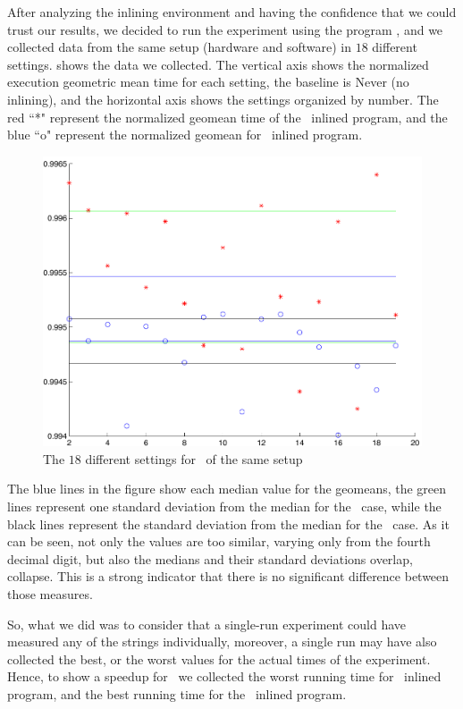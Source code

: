 After analyzing the inlining environment and having the confidence that we could trust our results, we decided to run the experiment using the program \bzip, and we collected data from the same setup (hardware and software) in $18$ different settings.  shows the data we collected. The vertical axis shows the normalized execution geometric mean time for each setting, the baseline is Never (no inlining), and the horizontal axis shows the settings organized by number. The red ``*" represent the normalized geomean time of the \FDO\ inlined program, and the blue ``o" represent the normalized geomean for \llvm\ inlined program.

\begin{figure}
  \centering
  \includegraphics[width=1.00\linewidth]{Figures/fdllrep}
  \caption{The $18$ different settings for \bzip\ of the same setup}
  \label{fig:fdllrep}
\end{figure}

The blue lines in the figure show each median value for the geomeans, the green lines represent one standard deviation from the median for the \FDI\ case, while the black lines represent the standard deviation from the median for the \llvm\ case. As it can be seen, not only the values are too similar, varying only from the fourth decimal digit, but also the medians and their standard deviations overlap, collapse. This is a strong indicator that there is no significant difference between those measures.

So, what we did was to consider that a single-run experiment could have measured any of the strings individually, moreover, a single run may have also collected the best, or the worst values for the actual times of the experiment. Hence, to show a speedup for \FDI\, we collected the worst running time for \llvm\ inlined program, and the best running time for the \FDI\ inlined program. 


